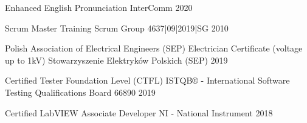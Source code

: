

\begin{cvhonors}

  \cvhonor
    {Enhanced English Pronunciation} %
    {InterComm} %
    {} %
    {2020} %

  \cvhonor
    {Scrum Master Training} %
    {Scrum Group} %
    {4637|09|2019|SG} %
    {2010} %

  \cvhonor
    {Polish Association of Electrical Engineers (SEP) Electrician Certificate (voltage up to 1kV)} %
    {Stowarzyszenie Elektryków Polskich (SEP)} %
    {} %
    {2019} %

  \cvhonor
    {Certified Tester Foundation Level (CTFL)} %
    {ISTQB® - International Software Testing Qualifications Board} %
    {66890} %
    {2019} %

  \cvhonor
    {Certified LabVIEW Associate Developer} %
    {NI - National Instrument} %
    {} %
    {2018} %

\end{cvhonors}
